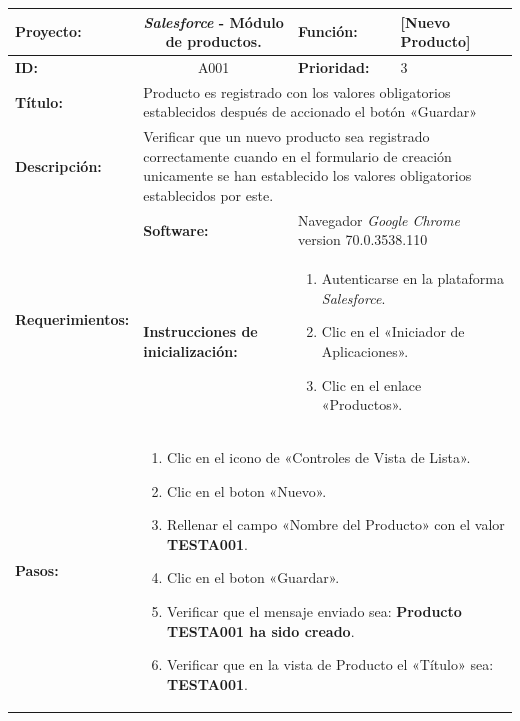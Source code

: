 \begin{table}[H]
\centering
\begin{tabular}{|p{2.5cm}|p{2.5cm}|p{2.8cm}|p{2.5cm}|p{2.6cm}|}
\hline
\footnotesize{\textbf{Proyecto:}} &
\multicolumn{2}{c|}{\footnotesize{\emph{Salesforce} - Módulo de productos.}} &
\footnotesize{\textbf{Función:}} & \footnotesize{[Nuevo Producto]} \\
\hline
\footnotesize{\textbf{ID:}} & \multicolumn{2}{c|}{\footnotesize{A001}} &
\footnotesize{\textbf{Prioridad:}} & \footnotesize{3} \\
\hline
\footnotesize{\textbf{Título:}} &
\multicolumn{4}{p{12.4cm}|}{\footnotesize{Producto es registrado con los valores
obligatorios establecidos después de accionado el botón «Guardar»}} \\
\hline
\footnotesize{\textbf{Descripción:}} &
\multicolumn{4}{p{12.4cm}|}{\footnotesize{Verificar que un nuevo producto sea
registrado correctamente cuando en el formulario de creación unicamente se han
establecido los valores obligatorios establecidos por este.}} \\
\hline
\multirow{2}{*}{\footnotesize{\textbf{Requerimientos:}}} &
\footnotesize{\textbf{Software:}} &
\multicolumn{3}{p{7.8cm}|}{\footnotesize{Navegador \emph{Google Chrome}
version 70.0.3538.110}} \\
\cline{2-5}
& \footnotesize{\textbf{Instrucciones de inicialización:}} &
\multicolumn{3}{p{7.8cm}|}{\footnotesize{
\begin{enumerate}
\item Autenticarse en la plataforma \emph{Salesforce}.
\item Clic en el «Iniciador de Aplicaciones».
\item Clic en el enlace «Productos».
\end{enumerate}
}} \\
\hline
\footnotesize{\textbf{Pasos:}} &
\multicolumn{4}{p{11.8cm}|}{\footnotesize{
\begin{enumerate}
\item Clic en el icono de «Controles de Vista de Lista».
\item Clic en el boton «Nuevo».
\item Rellenar el campo «Nombre del Producto» con el valor \textbf{TESTA001}.
\item Clic en el boton «Guardar».
\item Verificar que el mensaje enviado sea: \textbf{Producto TESTA001 ha sido creado}.
\item Verificar que en la vista de Producto el «Título» sea: \textbf{TESTA001}.

\end{enumerate}}}
\end{tabular}
\end{table}
